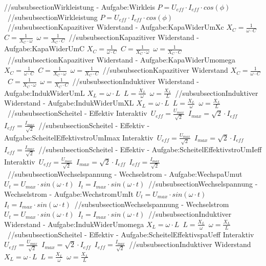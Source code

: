 //subsubsection{Wirkleistung - Aufgabe:Wirkleis} 
$ P = U_{eff}\cdot I_{eff}\cdot cos(\phi ) $\ 
//subsubsection{Wirkleistung} 
$ P = U_{eff}\cdot I_{eff}\cdot cos(\phi ) $\ 
//subsubsection{Kapazitiver Widerstand - Aufgabe:KapaWiderUmXc} 
$ X_{C} = \frac{ 1}{\omega \cdot C} $\ 
$ C = \frac{ 1}{X_{C} \cdot \omega } $\ 
$ \omega = \frac{ 1}{X_{C} \cdot C} $\ 
//subsubsection{Kapazitiver Widerstand - Aufgabe:KapaWiderUmC} 
$ X_{C} = \frac{ 1}{\omega \cdot C} $\ 
$ C = \frac{ 1}{X_{C} \cdot \omega } $\ 
$ \omega = \frac{ 1}{X_{C} \cdot C} $\ 
//subsubsection{Kapazitiver Widerstand - Aufgabe:KapaWiderUmomega} 
$ X_{C} = \frac{ 1}{\omega \cdot C} $\ 
$ C = \frac{ 1}{X_{C} \cdot \omega } $\ 
$ \omega = \frac{ 1}{X_{C} \cdot C} $\ 
//subsubsection{Kapazitiver Widerstand} 
$ X_{C} = \frac{ 1}{\omega \cdot C} $\ 
$ C = \frac{ 1}{X_{C} \cdot \omega } $\ 
$ \omega = \frac{ 1}{X_{C} \cdot C} $\ 
//subsubsection{Induktiver Widerstand - Aufgabe:IndukWiderUmL} 
$ X_{L} =\omega \cdot L $\ 
$ L = \frac{X_{L} }{\omega } $\ 
$ \omega =\frac{X_{L} }{L} $\ 
//subsubsection{Induktiver Widerstand - Aufgabe:IndukWiderUmXL} 
$ X_{L} =\omega \cdot L $\ 
$ L = \frac{X_{L} }{\omega } $\ 
$ \omega =\frac{X_{L} }{L} $\ 
//subsubsection{Scheitel - Effektiv} 
Interaktiv\ 
$ U_{eff}  = \frac{U_{max} }{\sqrt{2}} $\ 
$ I_{max}  = \sqrt{2}\cdot I_{eff} $\ 
$ I_{eff}  = \frac{I_{max} }{\sqrt{2}} $\ 
//subsubsection{Scheitel - Effektiv  - Aufgabe:ScheitelEffektivstroUmImax} 
Interaktiv\ 
$ U_{eff}  = \frac{U_{max} }{\sqrt{2}} $\ 
$ I_{max}  = \sqrt{2}\cdot I_{eff} $\ 
$ I_{eff}  = \frac{I_{max} }{\sqrt{2}} $\ 
//subsubsection{Scheitel - Effektiv  - Aufgabe:ScheitelEffektivstroUmIeff} 
Interaktiv\ 
$ U_{eff}  = \frac{U_{max} }{\sqrt{2}} $\ 
$ I_{max}  = \sqrt{2}\cdot I_{eff} $\ 
$ I_{eff}  = \frac{I_{max} }{\sqrt{2}} $\ 
//subsubsection{Wechselspannung - Wechselstrom - Aufgabe:WechspaUmut} 
$ U_{t}  = U_{max} \cdot sin(\omega \cdot t) $\ 
$ I_{t}  = I_{max} \cdot sin(\omega \cdot t) $\ 
//subsubsection{Wechselspannung - Wechselstrom - Aufgabe:WechstromUmIt} 
$ U_{t}  = U_{max} \cdot sin(\omega \cdot t) $\ 
$ I_{t}  = I_{max} \cdot sin(\omega \cdot t) $\ 
//subsubsection{Wechselspannung - Wechselstrom} 
$ U_{t}  = U_{max} \cdot sin(\omega \cdot t) $\ 
$ I_{t}  = I_{max} \cdot sin(\omega \cdot t) $\ 
//subsubsection{Induktiver Widerstand - Aufgabe:IndukWiderUmomega} 
$ X_{L} =\omega \cdot L $\ 
$ L = \frac{X_{L} }{\omega } $\ 
$ \omega =\frac{X_{L} }{L} $\ 
//subsubsection{Scheitel - Effektiv  - Aufgabe:ScheitelEffektivspaUeff} 
Interaktiv\ 
$ U_{eff}  = \frac{U_{max} }{\sqrt{2}} $\ 
$ I_{max}  = \sqrt{2}\cdot I_{eff} $\ 
$ I_{eff}  = \frac{I_{max} }{\sqrt{2}} $\ 
//subsubsection{Induktiver Widerstand} 
$ X_{L} =\omega \cdot L $\ 
$ L = \frac{X_{L} }{\omega } $\ 
$ \omega =\frac{X_{L} }{L} $\ 
